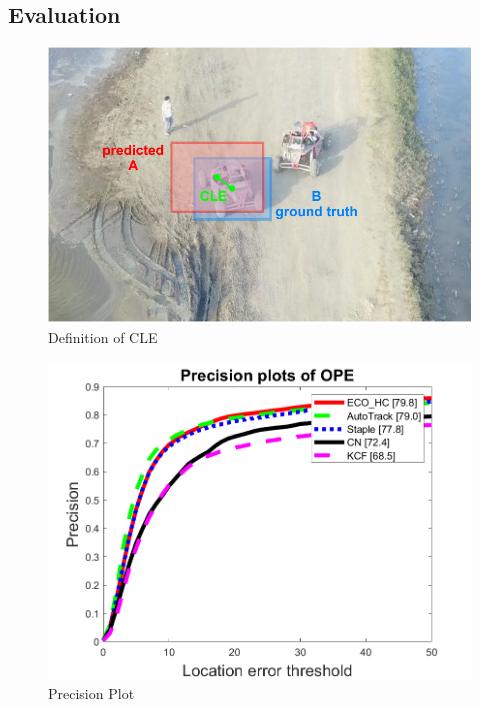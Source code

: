 \documentclass{beamer}
\begin{document}
\subsection{Evaluation}

\begin{frame}
    \begin{figure}[htpb]
        \begin{center}
            \includegraphics[width=0.8\linewidth]{fig/CLE.pdf}
            \caption{Definition of CLE}
        \end{center}
    \end{figure}
\end{frame}

\begin{frame}
    \begin{figure}[htpb]
        \begin{center}
            \includegraphics[width=0.8\linewidth]{fig/pre.png}
            \caption{Precision Plot}
        \end{center}
    \end{figure}
\end{frame}
\end{document}
